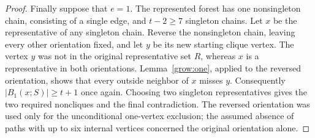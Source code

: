 \begin{proof}
Finally suppose that $e=1$.  The represented forest has one
nonsingleton chain, consisting of a single edge, and $t-2\ge 7$
singleton chains.  Let $x$ be the representative of any singleton
chain.  Reverse the nonsingleton chain, leaving every other
orientation fixed, and let $y$ be its new starting clique vertex.
The vertex $y$ was not in the original representative set $R$,
whereas $x$ is a representative in both orientations.
Lemma~\ref{grow:one}, applied to the reversed orientation, shows that
every outside neighbor of $x$ misses $y$.  Consequently
$|B_1(x;S)|\ge t+1$ once again.  Choosing two singleton
representatives gives the two required noncliques and the final
contradiction.  The reversed orientation was used only for the
unconditional one-vertex exclusion; the assumed absence of paths
with up to six internal vertices concerned the original orientation
alone.
\end{proof}
